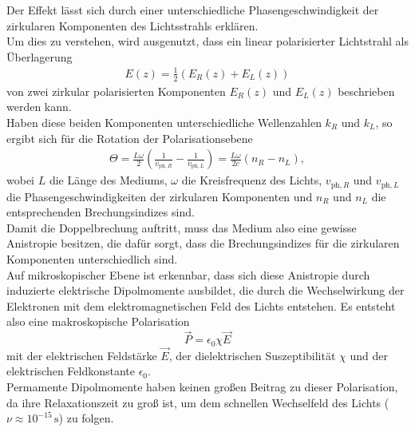 Der Effekt lässt sich durch einer unterschiedliche Phasengeschwindigkeit der zirkularen Komponenten des Lichtsstrahls erklären. \\
Um dies zu verstehen, wird ausgenutzt, dass ein linear polarisierter Lichtstrahl als Überlagerung 
\begin{align*}
    E(z) = \frac{1}{2}\left(E_R(z) + E_L(z)\right)
\end{align*}
von zwei zirkular polarisierten Komponenten $E_R(z)$ und $E_L(z)$ beschrieben werden kann. \\
Haben diese beiden Komponenten unterschiedliche Wellenzahlen $k_R$ und $k_L$, so ergibt sich für die Rotation der Polarisationsebene
\begin{align*}
    \Theta = \frac{L\omega}{2}\left(\frac{1}{v_{\text{ph},R}} - \frac{1}{v_{\text{ph},L}}\right) = \frac{L\omega}{2c}\left(n_R - n_L\right),
\end{align*}
wobei $L$ die Länge des Mediums, $\omega$ die Kreisfrequenz des Lichts, $v_{\text{ph},R}$ und $v_{\text{ph},L}$ die Phasengeschwindigkeiten der zirkularen Komponenten und $n_R$ und $n_L$ die entsprechenden Brechungsindizes sind. \\
Damit die Doppelbrechung auftritt, muss das Medium also eine gewisse Anistropie besitzen, die dafür sorgt, dass die Brechungsindizes für die zirkularen Komponenten unterschiedlich sind. \\

Auf mikroskopischer Ebene ist erkennbar, dass sich diese Anistropie durch induzierte elektrische Dipolmomente ausbildet, die durch die Wechselwirkung der Elektronen mit dem elektromagnetischen Feld des Lichts entstehen. Es entsteht also eine makroskopische Polarisation
\begin{equation}
    \vec{P} = \epsilon_0 \chi \vec{E}
    \label{eq:polarisation}
\end{equation} 
mit der elektrischen Feldstärke $\vec{E}$, der dielektrischen Suszeptibilität $\chi$ und der elektrischen Feldkonstante $\epsilon_0$. \\
Permamente Dipolmomente haben keinen großen Beitrag zu dieser Polarisation, da ihre Relaxationszeit zu groß ist, um dem schnellen Wechselfeld des Lichts ($\nu \approx 10^{-15}\,\text{s}$) zu folgen. \\

